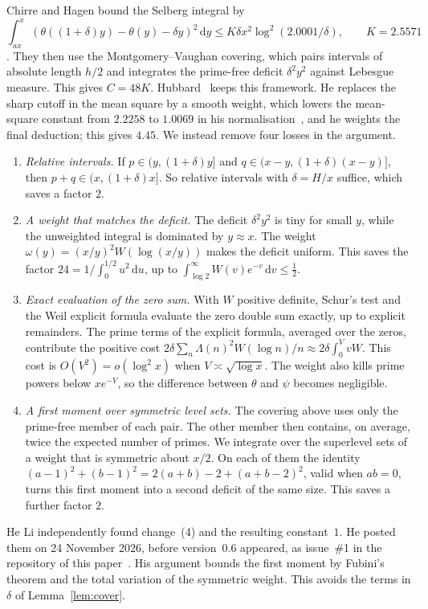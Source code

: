 \documentclass[11pt]{amsart}
\theoremstyle{remark}
\newcommand{\dd}{\,\mathrm{d}}
\begin{document}
Chirre and Hagen bound the Selberg integral by
\[
\int_{ax}^x(\theta((1+\delta)y)-\theta(y)-\delta y)^2\dd y\le K\delta x^2\log^2(2.0001/\delta),\qquad K=2.5571
\]
\cite[Thm.~3]{CH}. They then use the Montgomery--Vaughan covering, which pairs intervals of absolute length $h/2$ and integrates the prime-free deficit $\delta^2y^2$ against Lebesgue measure. This gives $C=48K$. Hubbard~\cite{Hubbard} keeps this framework. He replaces the sharp cutoff in the mean square by a smooth weight, which lowers the mean-square constant from $2.2258$ to $1.0069$ in his normalisation~\cite[\S1]{Hubbard}, and he weights the final deduction; this gives $4.45$. We instead remove four losses in the argument.
\begin{enumerate}[label=(\arabic*)]
\item \emph{Relative intervals.} If $p\in(y,(1+\delta)y]$ and $q\in(x-y,(1+\delta)(x-y)]$, then $p+q\in(x,(1+\delta)x]$. So relative intervals with $\delta=H/x$ suffice, which saves a factor $2$.
\item \emph{A weight that matches the deficit.} The deficit $\delta^2y^2$ is tiny for small $y$, while the unweighted integral is dominated by $y\approx x$. The weight $\omega(y)=(x/y)^2W(\log(x/y))$ makes the deficit uniform. This saves the factor $24=1/\int_0^{1/2}u^2\dd u$, up to $\int_{\log2}^\infty W(v)e^{-v}\dd v\le\tfrac12$.
\item \emph{Exact evaluation of the zero sum.} With $W$ positive definite, Schur's test and the Weil explicit formula evaluate the zero double sum exactly, up to explicit remainders. The prime terms of the explicit formula, averaged over the zeros, contribute the positive cost $2\delta\sum_n\Lambda(n)^2W(\log n)/n\approx2\delta\int_0^VvW$. This cost is $O(V^2)=o(\log^2x)$ when $V\asymp\sqrt{\log x}$. The weight also kills prime powers below $xe^{-V}$, so the difference between $\theta$ and $\psi$ becomes negligible.
\item \emph{A first moment over symmetric level sets.} The covering above uses only the prime-free member of each pair. The other member then contains, on average, twice the expected number of primes. We integrate over the superlevel sets of a weight that is symmetric about $x/2$. On each of them the identity $(a-1)^2+(b-1)^2=2(a+b)-2+(a+b-2)^2$, valid when $ab=0$, turns this first moment into a second deficit of the same size. This saves a further factor $2$.
\end{enumerate}
He Li independently found change~(4) and the resulting constant~$1$. He posted them on 24 November 2026, before version~0.6 appeared, as issue~\#1 in the repository of this paper~\cite{HeLi}. His argument bounds the first moment by Fubini's theorem and the total variation of the symmetric weight. This avoids the terms in $\delta$ of Lemma~\ref{lem:cover}.
\end{document}

